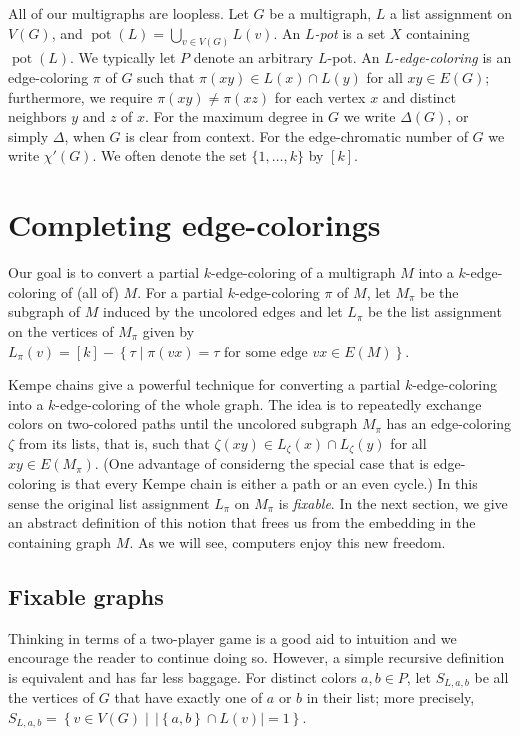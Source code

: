 \documentclass[12pt]{article}
\theoremstyle{plain}
\theoremstyle{definition}
\theoremstyle{remark}
\newcommand{\set}[1]{\left\{ #1 \right\}}
\newcommand{\setb}[3]{\left\{ #1 \in #2 \mid #3 \right\}}
\newcommand{\setbs}[2]{\left\{ #1 \mid #2 \right\}}
\newcommand{\card}[1]{\left|#1\right|}
\newcommand{\irange}[1]{\left[#1\right]}
\newcommand{\pot}{\operatorname{pot}}
\begin{document}
All of our multigraphs are loopless.  Let $G$ be a multigraph, $L$ a list
assignment on $V(G)$, and $\pot(L) = \bigcup_{v\in V(G)} L(v)$. An
\emph{$L$-pot} is a set $X$ containing $\pot(L)$.  
We typically let $P$ denote an arbitrary $L$-pot.  
An \emph{$L$-edge-coloring}
is an edge-coloring $\pi$ of $G$ such that $\pi(xy) \in L(x) \cap L(y)$ for all
$xy \in E(G)$;  %
furthermore, we require $\pi(xy)\ne \pi(xz)$ for each vertex $x$ and distinct
neighbors $y$ and $z$ of $x$.
For the maximum degree in $G$ we write $\Delta(G)$, or simply
$\Delta$, when $G$ is clear from context.
For the edge-chromatic number of $G$ we write $\chi'(G)$.
We often denote the set $\{1,\ldots,k\}$ by $[k]$.

\section{Completing edge-colorings}
Our goal is to convert a partial $k$-edge-coloring of a multigraph $M$ into a
$k$-edge-coloring of (all of) $M$.  For a partial $k$-edge-coloring $\pi$ of
$M$, let $M_\pi$ be the subgraph of $M$ induced by the uncolored edges and let
$L_\pi$ be the list assignment on the vertices of $M_\pi$ given by 
$L_\pi(v) = \irange{k} - \setbs{\tau}{\pi(vx) = \tau \text{ for some edge  } vx \in E(M)}$. 

Kempe chains give a powerful technique for converting a partial
$k$-edge-coloring into a $k$-edge-coloring of the whole graph.  The idea is to
repeatedly exchange colors on two-colored paths until the uncolored subgraph
$M_\pi$ has an edge-coloring $\zeta$ from its lists, that is, such that
$\zeta(xy) \in L_\zeta(x) \cap
L_\zeta(y)$ for all $xy \in E(M_\pi)$.  (One advantage of considerng the special
case that is edge-coloring is that every Kempe chain is either a path or an even
cycle.) In this sense the original list
assignment $L_\pi$ on $M_\pi$ is \emph{fixable}. In the next section, we give
an abstract definition of this notion that frees us from the embedding in the
containing graph $M$.  As we will see, computers enjoy this new freedom.


\subsection{Fixable graphs}
Thinking in terms of a two-player game is a good aid to intuition and we
encourage the reader to continue doing so. However, a simple recursive
definition is equivalent and has far less baggage. For distinct colors $a,b
\in P$, let $S_{L,a,b}$ be all the vertices of $G$ that have exactly one of $a$
or $b$ in their list; more precisely, $S_{L,a,b} =
\setb{v}{V(G)}{\,\card{\set{a,b} \cap L(v)} = 1}$.  
\end{document}
